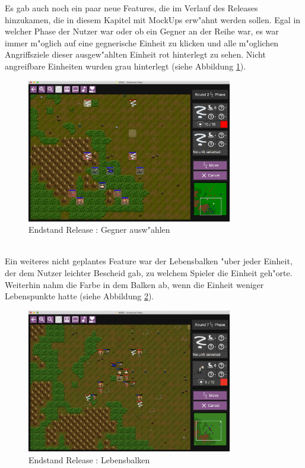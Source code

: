\documentclass[12pt, titlepage]{scrartcl}
\newcommand{\RN}[1]{%
	\textup{\uppercase\expandafter{\romannumeral#1}}%
}
\newcounter{subsubsubsection}[subsubsection]
\begin{document}
					Es gab auch noch ein paar neue Features, die im Verlauf des Releases \RN{3} hinzukamen, die in diesem Kapitel mit MockUps erw"ahnt werden sollen.
					\vspace{0.3cm} \newline
					Egal in welcher Phase der Nutzer war oder ob ein Gegner an der Reihe war, es war immer m"oglich auf eine gegnerische Einheit zu klicken und alle m"oglichen Angriffsziele dieser ausgew"ahlten Einheit rot hinterlegt zu sehen. Nicht angreifbare Einheiten wurden grau hinterlegt (siehe Abbildung \ref{End_Select_Enemy}).
					\begin{figure}[H] 
						\centering
						\includegraphics[width=0.8\textwidth]{images/endOfRelease/SelectEnemy.png}
						\caption{Endstand Release \RN{3}: Gegner ausw"ahlen}
						\label{End_Select_Enemy}
					\end{figure}
					\ \\ Ein weiteres nicht geplantes Feature war der Lebensbalken "uber jeder Einheit, der dem Nutzer leichter Bescheid gab, zu welchem Spieler die Einheit geh"orte. Weiterhin nahm die Farbe in dem Balken ab, wenn die Einheit weniger Lebenspunkte hatte (siehe Abbildung \ref{End_Healthbar_Down}).
					\begin{figure}[H] 
						\centering
						\includegraphics[width=0.8\textwidth]{images/endOfRelease/HealthbarDown.png}
						\caption{Endstand Release \RN{3}: Lebensbalken}
						\label{End_Healthbar_Down}
					\end{figure}
\end{document}

